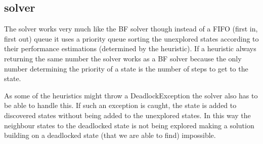 \subsection{\astar solver}
The \astar solver works very much like the BF solver though instead of a FIFO (first in, first out) queue it uses a priority queue sorting the unexplored states according to their performance estimations (determined by the heuristic). If a heuristic always returning the same number the solver works as a BF solver because the only number determining the priority of a state is the number of steps to get to the state.

As some of the heuristics might throw a DeadlockException the \astar solver also has to be able to handle this. If such an exception is caught, the state is added to discovered states without being added to the unexplored states. In this way the neighbour states to the deadlocked state is not being explored making a solution building on a deadlocked state (that we are able to find) impossible.

